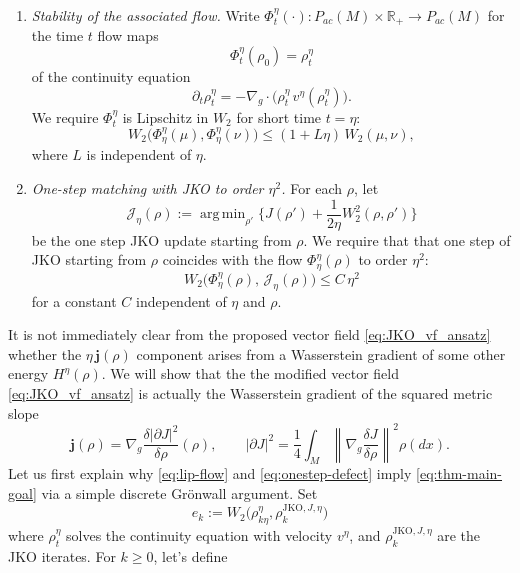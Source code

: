 \documentclass[reqno,11pt,letterpaper]{amsart}
\theoremstyle{plain}
\theoremstyle{definition}
\theoremstyle{remark}
\DeclareMathOperator*{\argmin}{arg\,min}
\newcommand{\abs}[1]{\left|#1\right|}
\newcommand{\norm}[1]{\left\lVert#1\right\rVert}
\begin{document}
\begin{enumerate}[leftmargin=*]
    \item \emph{Stability of the associated flow.} Write $\Phi_t^\eta (\cdot) : P_{ac}(M) \times \mathbb{R}_{+} \to P_{ac}(M)$ for the time $t$ flow maps
    \[
    \Phi_t^\eta(\rho_0) =\rho_t^\eta
    \]
    of the continuity equation
    \[
    \partial_t \rho_t^\eta = -\nabla_g \cdot\big(\rho_t^\eta\,v^\eta(\rho_t^\eta)\big).
    \]
    We require $\Phi_t^\eta$ is Lipschitz in $W_2$ for short time $t=\eta$:
    \begin{equation}\label{eq:lip-flow}
    W_2\big(\Phi_\eta^\eta(\mu),\Phi_\eta^\eta(\nu)\big)
    \le (1 + L\eta)\,W_2(\mu,\nu),
    \end{equation}
    where $L$ is independent of $\eta$.
    
    \item \emph{One-step matching with JKO to order $\eta^2$.} For each $\rho$, let
    \begin{equation}
    \label{eq:JKO-def-outline}
    \mathcal J_\eta(\rho)
    := \argmin_{\rho'} \Big\{J(\rho') + \frac{1}{2\eta}W_2^2(\rho,\rho')\Big\}    
    \end{equation}
    be the one step JKO update starting from $\rho$. We require that that one step of JKO starting from $\rho$ coincides with the flow $\Phi_\eta^\eta(\rho)$ to order $\eta^2$:
    \begin{equation}\label{eq:onestep-defect}
    W_2\big(\Phi_\eta^\eta(\rho),\,\mathcal J_\eta(\rho)\big) \le C\,\eta^2
    \end{equation}
    for a constant $C$ independent of $\eta$ and $\rho$.
\end{enumerate}
It is not immediately clear from the proposed vector field \eqref{eq:JKO_vf_ansatz} whether the $\eta \,\bm{j}(\rho)$ component arises from a Wasserstein gradient of some other energy $H^{\eta}(\rho)$. We will show that the the modified vector field \eqref{eq:JKO_vf_ansatz} is actually the Wasserstein gradient of the squared metric slope 
\[
{\bm j}(\rho) = \nabla_g \frac{\delta \abs{\partial J}^2}{\delta \rho}(\rho),\qquad \abs{\partial J}^2 =\frac{1}{4} \int_M \norm{\nabla_g \frac{\delta J}{\delta \rho}}^2 \rho(dx).
\]
Let us first explain why \eqref{eq:lip-flow} and \eqref{eq:onestep-defect} imply \eqref{eq:thm-main-goal} via a simple discrete Grönwall argument. Set
\[
e_k := W_2\big(\rho_{k\eta}^\eta,\rho_k^{\mathrm{JKO},J,\eta}\big)
\]
where $\rho_t^\eta$ solves the continuity equation with velocity $v^\eta$, and $\rho_k^{\mathrm{JKO},J,\eta}$ are the JKO iterates. For $k\ge0$, let's define
\end{document}
